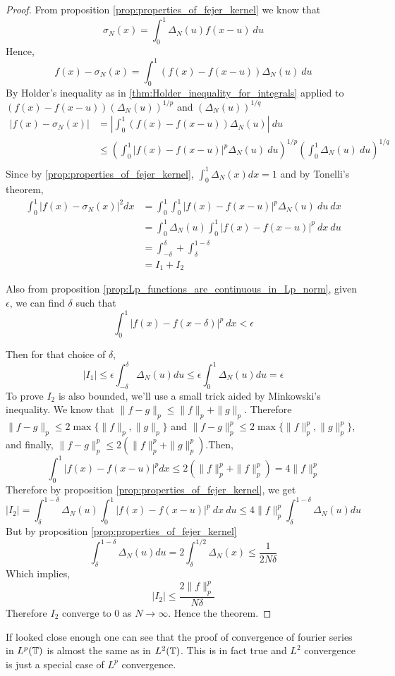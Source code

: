 \begin{proof}
  From proposition \ref{prop:properties_of_fejer_kernel} we know that
  \begin{displaymath}
    \sigma_N(x) = \int_0^1 \Delta_N(u)f(x-u) \ du 
  \end{displaymath}
  Hence,
  $$ f(x) - \sigma_N(x) = \int_0^1 (f(x) - f(x-u))\Delta_N(u) \ du $$ 
  By Holder's inequality as in \ref{thm:Holder_inequality_for_integrals} applied to $(f(x) - f(x-u))(\Delta_N(u))^{1/p}$ and $(\Delta_N(u))^{1/q}$ 
  \begin{align*}
    |f(x) - \sigma_N(x)| &= \left| \int_0^1 (f(x) - f(x-u))\Delta_N(u) \right| \ du \\
          &\le \left( \int_0^1 |f(x) - f(x-u)|^{p} \Delta_N(u) \ du \right)^{1/p} \left( \int_0^1 \Delta_N(u) \ du \right)^{1/q} \\
  \end{align*}
  Since by \ref{prop:properties_of_fejer_kernel}, $\int_0^1 \Delta_N(x) dx = 1$ and by Tonelli's theorem, 
  \begin{align*}
    \int_0^1 |f(x) - \sigma_N(x)|^2 dx &= \int_0^1 \int_0^1 |f(x) - f(x-u)|^{p} \Delta_N(u) \ du  \ dx \\
          & = \int_0^1 \Delta_N(u) \int_0^1 |f(x) - f(x-u)|^{p} \ dx  \ du \\
          & = \int_{-\delta}^\delta + \int_\delta^{1-\delta} \\
          & = I_1 + I_2
  \end{align*}

  Also from proposition \ref{prop:Lp_functions_are_continuous_in_Lp_norm}, given $\epsilon$, we can find $\delta$ such that 
  $$ \int_0^1|f(x) - f(x-\delta)|^p \ dx < \epsilon$$

  Then for that choice of $\delta$,
  $$|I_1| \le \epsilon \int_{-\delta}^\delta \Delta_N(u) du \le \epsilon \int_0^1 \Delta_N(u) du = \epsilon$$
 To prove $I_2$ is also bounded, we'll use a small trick aided by Minkowski's inequality. We know that $\|f-g\|_p \le \|f\|_p + \|g\|_p$. Therefore $\|f-g\|_p \le 2\max\{\|f\|_p, \|g\|_p\}$ and $\|f-g\|_p^p \le 2\max\{\|f\|_p^p, \|g\|_p^p\}$, and finally, $\|f-g\|_p^p \le 2(\|f\|_p^p + \|g\|_p^p)$.Then, 
  $$ \int_0^1 |f(x) - f(x-u)|^p dx \le 2(\|f\|_p^p + \|f\|_p^p) = 4\|f\|_p^p$$
  Therefore by proposition \ref{prop:properties_of_fejer_kernel}, we get 
  $$|I_2| = \int_\delta^{1-\delta} \Delta_N(u) \int_0^1 |f(x) - f(x-u)|^{p} \ dx  \ du \le 4\|f\|_p^p \int_\delta^{1-\delta}\Delta_N(u) du$$
  But by proposition \ref{prop:properties_of_fejer_kernel} 
  $$ \int_\delta^{1-\delta}\Delta_N(u)du = 2\int_\delta^{1/2}\Delta_N(x) \le \frac{1}{2N\delta}$$
  Which implies, 
  $$ |I_2| \le \frac{2\|f\|_p^p}{N\delta}$$
  Therefore $I_2$ converge to $0$ as $N \to \infty$. Hence the theorem.
\end{proof}

If looked close enough one can see that the proof of convergence of fourier series in $L^p(\mathbb T)$ is almost the same as in $L^2(\mathbb T)$. This is in fact true and $L^2$ convergence is just a special case of $L^p$ convergence.
